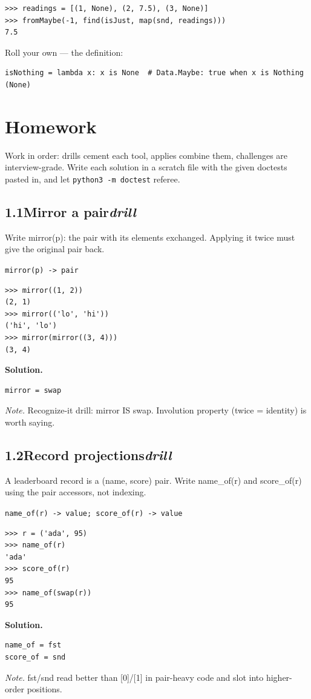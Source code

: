 \documentclass[10pt,letterpaper]{book}
\begin{document}
\begin{lstlisting}[style=ex]
>>> readings = [(1, None), (2, 7.5), (3, None)]
>>> fromMaybe(-1, find(isJust, map(snd, readings)))
7.5
\end{lstlisting}

Roll your own --- the definition:

\begin{lstlisting}[style=ex]
isNothing = lambda x: x is None  # Data.Maybe: true when x is Nothing (None)
\end{lstlisting}

\section{Homework}
Work in order: drills cement each tool, applies combine them,
challenges are interview-grade. Write each solution in a scratch file with
the given doctests pasted in, and let \texttt{python3 -m doctest} referee.
\subsection*{1.1\quad Mirror a pair\hfill\textnormal{\textit{drill}}}
Write mirror(p): the pair with its elements exchanged. Applying it twice must give the original pair back.

\noindent\texttt{mirror(p) -> pair}
\begin{lstlisting}[style=ex]
>>> mirror((1, 2))
(2, 1)
>>> mirror(('lo', 'hi'))
('hi', 'lo')
>>> mirror(mirror((3, 4)))
(3, 4)
\end{lstlisting}
\noindent\textbf{Solution.}
\begin{lstlisting}[style=code]
mirror = swap
\end{lstlisting}
\noindent\textit{Note.} Recognize-it drill: mirror IS swap. Involution property (twice = identity) is worth saying.

\subsection*{1.2\quad Record projections\hfill\textnormal{\textit{drill}}}
A leaderboard record is a (name, score) pair. Write name\_of(r) and score\_of(r) using the pair accessors, not indexing.

\noindent\texttt{name\_of(r) -> value; score\_of(r) -> value}
\begin{lstlisting}[style=ex]
>>> r = ('ada', 95)
>>> name_of(r)
'ada'
>>> score_of(r)
95
>>> name_of(swap(r))
95
\end{lstlisting}
\noindent\textbf{Solution.}
\begin{lstlisting}[style=code]
name_of = fst
score_of = snd
\end{lstlisting}
\noindent\textit{Note.} fst/snd read better than [0]/[1] in pair-heavy code and slot into higher-order positions.
\end{document}
